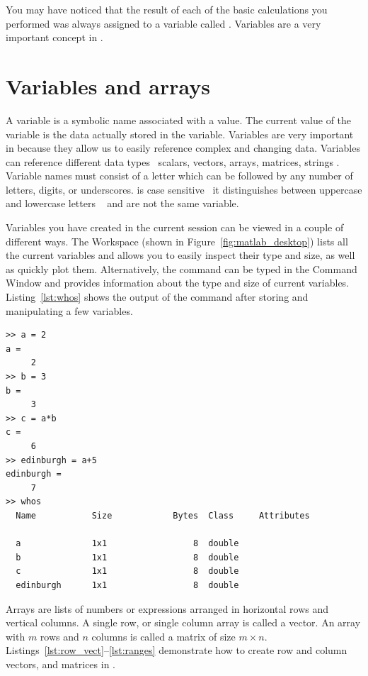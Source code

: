 You may have noticed that the result of each of the basic calculations you performed was always assigned to a variable called . Variables are a very important concept in \mlab.

\section{Variables and arrays}
A variable is a symbolic name associated with a value. The current value of the variable is the data actually stored in the variable. Variables are very important in \mlab because they allow us to easily reference complex and changing data. Variables can reference different data types \ie\ scalars, vectors, arrays, matrices, strings \etc. Variable names must consist of a letter which can be followed by any number of letters, digits, or underscores. \mlab is case sensitive \ie\ it distinguishes between uppercase and lowercase letters \eg\  and  are not the same variable.

Variables you have created in the current \mlab session can be viewed in a couple of different ways. The Workspace (shown in Figure~\ref{fig:matlab_desktop}) lists all the current variables and allows you to easily inspect their type and size, as well as quickly plot them. Alternatively, the  command can be typed in the Command Window and provides information about the type and size of current variables. Listing~\ref{lst:whos} shows the output of the  command after storing and manipulating a few variables.

\begin{lstlisting}[caption={Using the \mcode{whos} command},label=lst:whos]
>> a = 2
a = 
	 2
>> b = 3
b = 
	 3
>> c = a*b
c = 
	 6
>> edinburgh = a+5
edinburgh = 
	 7
>> whos
  Name           Size            Bytes  Class     Attributes

  a              1x1                 8  double              
  b              1x1                 8  double              
  c              1x1                 8  double              
  edinburgh      1x1                 8  double
\end{lstlisting}

Arrays are lists of numbers or expressions arranged in horizontal rows and vertical columns. A single row, or single column array is called a vector. An array with $m$ rows and $n$ columns is called a matrix of size $m \times n$. Listings~\ref{lst:row_vect}--\ref{lst:ranges} demonstrate how to create row and column vectors, and matrices in \mlab.

